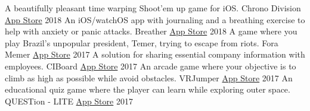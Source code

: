 

\begin{cventries}
  \cvcompactentry
    {A beautifully pleasant time warping Shoot'em up game for iOS.}
    {Chrono Division}
    {\href{https://itunes.apple.com/app/id1437675179?mt=8}{App Store}}
    {2018}
  \cvcompactentry
    {An iOS/watchOS app with journaling and a breathing exercise to help with anxiety or panic attacks.}
    {Breather}
    {\href{https://itunes.apple.com/app/id1370659046?mt=8}{App Store}}
    {2018}
  \cvcompactentry
    {A game where you play Brazil's unpopular president, Temer, trying to escape from riots.}
    {Fora Memer}
    {\href{https://itunes.apple.com/br/app/fora-memer/id1253655537?l=en&mt=8}{App Store}}
    {2017}
  \cvcompactentry
    {A solution for sharing essential company information with employees.}
    {CIBoard}
    {\href{https://itunes.apple.com/app/id1293364926?mt=8}{App Store}}
    {2017}
  \cvcompactentry
    {An arcade game where your objective is to climb as high as possible while avoid obstacles.}
    {VRJumper}
    {\href{https://itunes.apple.com/app/id1262625055?mt=8}{App Store}}
    {2017}
  \cvcompactentry
    {An educational quiz game where the player can learn while exploring outer space.}
    {QUESTion - LITE}
    {\href{https://itunes.apple.com/app/id1233411790?mt=8}{App Store}}
    {2017}
\end{cventries}


